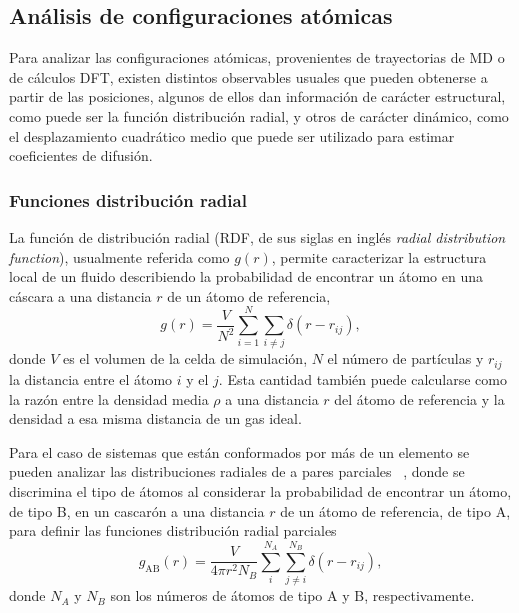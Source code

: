 \subsection{Análisis de configuraciones atómicas}\label{s:observables}

Para analizar las configuraciones atómicas, provenientes de trayectorias de MD
o de cálculos DFT, existen distintos observables usuales que pueden obtenerse
a partir de las posiciones, algunos de ellos dan información de carácter 
estructural, como puede ser la función distribución radial, y otros de carácter 
dinámico, como el desplazamiento cuadrático medio que puede ser utilizado para 
estimar coeficientes de difusión.

\subsubsection{Funciones distribución radial}\label{ss:rdf}

La función de distribución radial (RDF, de sus siglas en inglés \textit{radial 
distribution function}), usualmente referida como $g(r)$, permite caracterizar la
estructura local de un fluido describiendo la probabilidad de encontrar un átomo
en una cáscara a una distancia $r$ de un átomo de referencia,
\begin{equation}\label{eq:rdf}
    g(r) = \frac{V}{N^2} \sum_{i=1}^N \sum_{i \neq j} \delta(r - r_{ij}),
\end{equation}
donde $V$ es el volumen de la celda de simulación, $N$ el número de partículas y 
$r_{ij}$ la distancia entre el átomo $i$ y el $j$. Esta cantidad también puede 
calcularse como la razón entre la densidad media $\rho$ a una distancia $r$ del 
átomo de referencia y la densidad a esa misma distancia de un gas ideal.

Para el caso de sistemas que están conformados por más de un elemento se pueden 
analizar las distribuciones radiales de a pares parciales ~\cite{lamparter1995}, 
donde se discrimina el tipo de átomos al considerar la probabilidad de encontrar 
un átomo, de tipo B, en un cascarón a una distancia $r$ de un átomo de referencia, 
de tipo A, para definir las funciones distribución radial parciales
\begin{equation}\label{eq:prdf}
    g_{\text{AB}}(r) = \frac{V}{4 \pi r^2 N_B} \sum_{i}^{N_A} \sum_{j\neq i}^{N_B} \delta(r - r_{ij}),
\end{equation}
donde $N_A$ y $N_B$ son los números de átomos de tipo A y B, respectivamente. 

